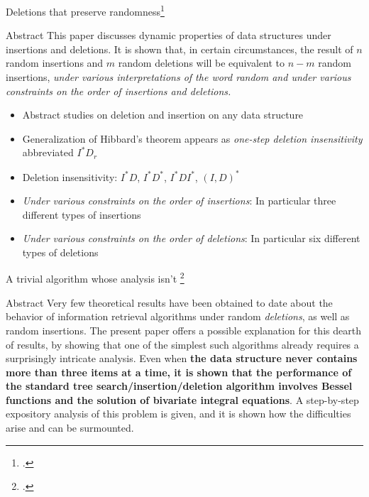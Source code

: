 \documentclass{beamer}
\begin{document}
\begin{frame}{Deletions that preserve randomness\footcite{knuth1977deletions}}
    \begin{block}{Abstract}
        This paper discusses dynamic properties of data structures under
        insertions and deletions. It is shown that, in certain circumstances,
        the result of $n$ random insertions and $m$ random deletions will be
        equivalent to $n-m$ random insertions, \textit{under various interpretations of
            the word \textit{random} and under various constraints on the order of insertions
        and deletions.}
    \end{block}
\end{frame}

\begin{frame}
    \begin{itemize}
        \item Abstract studies on deletion and insertion on any data structure
            \pause
        \item Generalization of Hibbard's theorem appears as \textit{one-step deletion insensitivity} abbreviated $I^* D_r$
            \pause
        \item Deletion insensitivity: $I^*D$, $I^*D^*$, $I^*DI^*$, $(I,D)^*$
            \pause
        \item \textit{Under various constraints on the order of insertions}: In particular three different types of insertions
        \item \textit{Under various constraints on the order of deletions}: In particular six different types of deletions
    \end{itemize}
\end{frame}


\begin{frame}{A trivial algorithm whose analysis isn't \footcite{jonassen1978trivial}}
    \begin{block}{Abstract}
        Very few theoretical results have been obtained to date about the behavior of information retrieval algorithms under random \textit{deletions}, as well as random insertions. The present paper offers a possible explanation for this dearth of results, by showing that one of the simplest such algorithms already requires a surprisingly intricate analysis. Even when \textbf{the data structure never contains more than three items at a time, it is shown that the performance of the standard tree search/insertion/deletion algorithm involves Bessel functions and the solution of bivariate integral equations}. A step-by-step expository analysis of this problem is given, and it is shown how the difficulties arise and can be surmounted.
    \end{block}
\end{frame}
\end{document}
